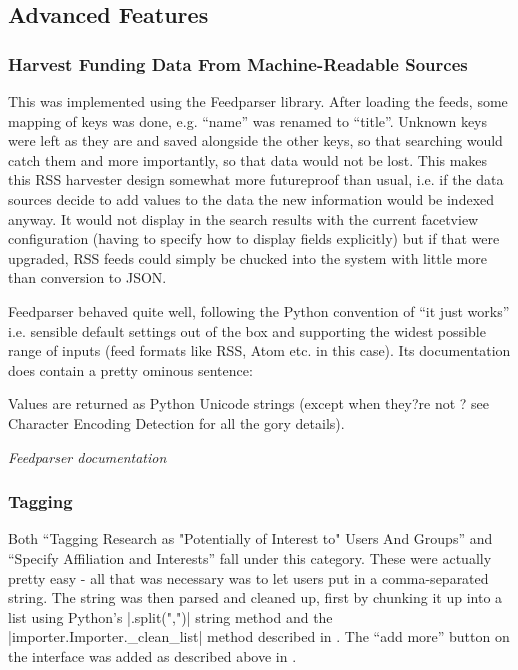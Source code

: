 \subsection{Advanced Features}

\subsubsection{Harvest Funding Data From Machine-Readable Sources}
This was implemented using the Feedparser \cite{feedparser} library. After loading the feeds, some mapping of keys was done, e.g. ``name'' was renamed to ``title''. Unknown keys were left as they are and saved alongside the other keys, so that searching would catch them and more importantly, so that data would not be lost. This makes this RSS harvester design somewhat more futureproof than usual, i.e. if the data sources decide to add values to the data the new information would be indexed anyway. It would not display in the search results with the current facetview configuration (having to specify how to display fields explicitly) but if that were upgraded, RSS feeds could simply be chucked into the system with little more than conversion to JSON.

Feedparser behaved quite well, following the Python convention of ``it just works'' i.e. sensible default settings out of the box and supporting the widest possible range of inputs (feed formats like RSS, Atom etc. in this case). Its documentation does contain a pretty ominous sentence:

\begin{shadequote}
Values are returned as Python Unicode strings (except when they?re not ? see Character Encoding Detection for all the gory details).
\par\emph{Feedparser documentation \cite{feedparser-ominous}}
\end{shadequote}

\subsubsection{Tagging}
Both ``Tagging Research as "Potentially of Interest to" Users And Groups'' and ``Specify Affiliation and Interests'' fall under this category. These were actually pretty easy - all that was necessary was to let users put in a comma-separated string. The string was then parsed and cleaned up, first by chunking it up into a list using Python's |.split(",")|  string method and the |importer.Importer._clean_list| method described in . The ``add more'' button on the interface was added as described above in .

